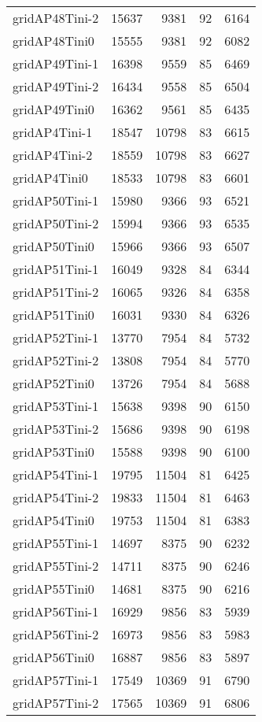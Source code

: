 \documentclass[../../../thesis.tex]{subfiles}
\begin{document}
\begin{longtable}{lrrrr}
gridAP48Tini-2 & 15637 & 9381 & 92 & 6164 \\
gridAP48Tini0 & 15555 & 9381 & 92 & 6082 \\
gridAP49Tini-1 & 16398 & 9559 & 85 & 6469 \\
gridAP49Tini-2 & 16434 & 9558 & 85 & 6504 \\
gridAP49Tini0 & 16362 & 9561 & 85 & 6435 \\
gridAP4Tini-1 & 18547 & 10798 & 83 & 6615 \\
gridAP4Tini-2 & 18559 & 10798 & 83 & 6627 \\
gridAP4Tini0 & 18533 & 10798 & 83 & 6601 \\
gridAP50Tini-1 & 15980 & 9366 & 93 & 6521 \\
gridAP50Tini-2 & 15994 & 9366 & 93 & 6535 \\
gridAP50Tini0 & 15966 & 9366 & 93 & 6507 \\
gridAP51Tini-1 & 16049 & 9328 & 84 & 6344 \\
gridAP51Tini-2 & 16065 & 9326 & 84 & 6358 \\
gridAP51Tini0 & 16031 & 9330 & 84 & 6326 \\
gridAP52Tini-1 & 13770 & 7954 & 84 & 5732 \\
gridAP52Tini-2 & 13808 & 7954 & 84 & 5770 \\
gridAP52Tini0 & 13726 & 7954 & 84 & 5688 \\
gridAP53Tini-1 & 15638 & 9398 & 90 & 6150 \\
gridAP53Tini-2 & 15686 & 9398 & 90 & 6198 \\
gridAP53Tini0 & 15588 & 9398 & 90 & 6100 \\
gridAP54Tini-1 & 19795 & 11504 & 81 & 6425 \\
gridAP54Tini-2 & 19833 & 11504 & 81 & 6463 \\
gridAP54Tini0 & 19753 & 11504 & 81 & 6383 \\
gridAP55Tini-1 & 14697 & 8375 & 90 & 6232 \\
gridAP55Tini-2 & 14711 & 8375 & 90 & 6246 \\
gridAP55Tini0 & 14681 & 8375 & 90 & 6216 \\
gridAP56Tini-1 & 16929 & 9856 & 83 & 5939 \\
gridAP56Tini-2 & 16973 & 9856 & 83 & 5983 \\
gridAP56Tini0 & 16887 & 9856 & 83 & 5897 \\
gridAP57Tini-1 & 17549 & 10369 & 91 & 6790 \\
gridAP57Tini-2 & 17565 & 10369 & 91 & 6806 \\

\end{longtable}
\end{document}
